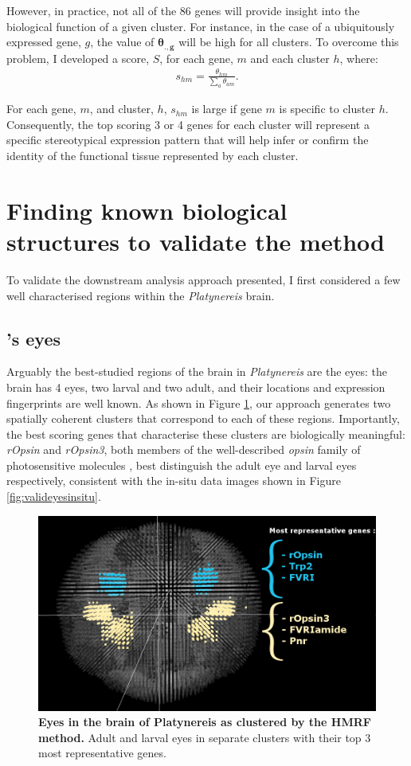 	However, in practice, not all of the 86 genes will provide insight into the biological function of a given cluster. For instance, in the case of a ubiquitously expressed gene, $g$, the value of $\boldsymbol{\theta_{.,g}}$ will be high for all clusters. To overcome this problem, I developed a score, $S$, for each gene, $m$ and each cluster $h$, where:
\begin{align*}
s_{hm} = \frac{\theta_{hm}}{\sum_{a} \theta_{am}}.
\end{align*}

For each gene, $m$, and cluster, $h$, $s_{hm}$ is large if gene $m$ is specific to cluster $h$. Consequently, the top scoring 3 or 4 genes for each cluster will represent a specific stereotypical expression pattern that will help infer or confirm the identity of the functional tissue represented by each cluster.

	\section{Finding known biological structures to validate the method}
	To validate the downstream analysis approach presented, I first considered a few well characterised regions within the {\it{Platynereis}} brain.
		\subsection{\platy{}'s eyes}
		Arguably the best-studied regions of the brain in {\it{Platynereis}} are the eyes: the brain has 4 eyes, two larval and two adult, and their locations and expression fingerprints are well known. As shown in Figure \ref{fig:valideyesclust}, our approach generates two spatially coherent clusters that correspond to each of these regions. Importantly, the best scoring genes that characterise these clusters are biologically meaningful: {\it{rOpsin}} and {\it{rOpsin3}}, both members of the well-described \emph{opsin} family of photosensitive molecules \cite{terakita05,randel13}, best distinguish the adult eye and larval eyes respectively, consistent with the in-situ data images shown in Figure \ref{fig:valideyesinsitu}.
	\begin{figure}[h]
\centerline{\includegraphics[width=0.8\linewidth]{gfx/chapter6/eyes.png}}
\caption{{\bf Eyes in the brain of Platynereis as clustered by the HMRF method.} Adult and larval eyes in separate clusters with their top 3 most representative genes.}
\label{fig:valideyesclust}
	\end{figure}
	

